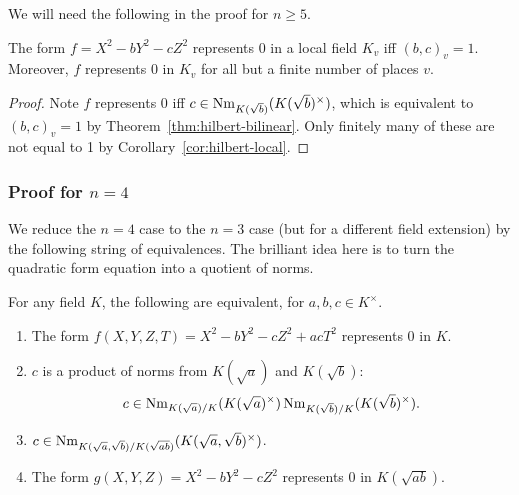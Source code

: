 We will need the following in the proof for $n\ge 5$.
\begin{lem}
The form $f=X^2-bY^2-cZ^2$ represents 0 in a local field $K_v$ iff $(b,c)_v=1$. Moreover, $f$ represents 0 in $K_v$ for all but a finite number of places $v$.
\end{lem}
\begin{proof}
Note $f$ represents 0 iff $c\in \operatorname{Nm}_{K(\sqrt{b})}(K(\sqrt{b})^{\times})$, which is equivalent to $(b,c)_v=1$ by Theorem~\ref{thm:hilbert-bilinear}. Only finitely many of these are not equal to 1 by Corollary~\ref{cor:hilbert-local}.
\end{proof}
\subsubsection{Proof for $n=4$}
We reduce the $n=4$ case to the $n=3$ case (but for a different field extension) by the following string of equivalences. The brilliant idea here is to turn the quadratic form equation into a quotient of norms.
\begin{thm}
For any field $K$, the following are equivalent, for $a,b,c\in K^{\times}$.
\begin{enumerate}
\item
The form $f(X,Y,Z,T)=X^2-bY^2-cZ^2+acT^2$ represents 0 in $K$.
\item
$c$ is a product of norms from $K(\sqrt a)$ and $K(\sqrt b)$: \[c\in \operatorname{Nm}_{K(\sqrt{a})/K}(K(\sqrt{a})^{\times})\operatorname{Nm}_{K(\sqrt{b})/K}(K(\sqrt{b})^{\times}).\]
\item
$c\in \operatorname{Nm}_{K(\sqrt a,\sqrt b)/K(\sqrt{ab})}(K(\sqrt a,\sqrt b)^{\times})$.
\item
The form $g(X,Y,Z)=X^2-bY^2-cZ^2$ represents 0 in $K(\sqrt{ab})$.
\end{enumerate}
\end{thm}
